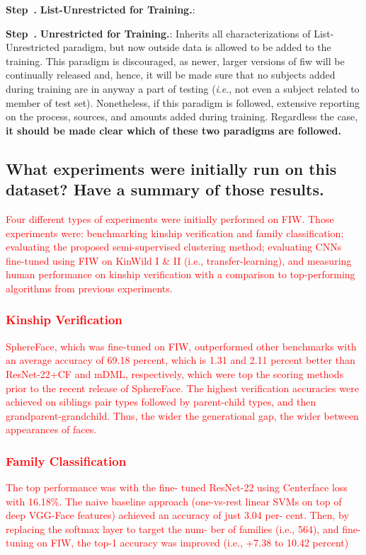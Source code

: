 \documentclass[a4paper,9pt]{extarticle}
\newcommand{\ie}{\textit{i}.\textit{e}., }
\newcounter{step}[section]
\newenvironment{step}[2][]
{%
    \refstepcounter{step}\par\medskip
    \noindent\textbf{Step~\thestep. #1}{\textbf{#2}:}\rmfamily
}%
{\medskip}
\begin{document}
\begin{multicols}{2}
\begin{step}{List-Unrestricted for Training.}
     \end{step}
    
    
\begin{step}{Unrestricted for Training.} Inherits all characterizations of List-Unrestricted paradigm, but now outside data is allowed to be added to the training. This paradigm is discouraged, as newer, larger versions of \gls{fiw} will be continually released and, hence, it will be made sure that no subjects added during training are in anyway a part of testing (\ie not even a subject related to member of test set). Nonetheless, if this paradigm is followed, extensive reporting on the process, sources, and amounts added during training.
 \end{step}
Regardless the case, \textbf{it should be made clear which of these two paradigms are followed.}

\subsection*{What experiments were initially run on this dataset? Have a summary of those results.}
\noindent \textcolor{red}{
Four different types of experiments were initially performed on FIW. Those experiments were:  benchmarking kinship verification and family classification; evaluating the proposed semi-supervised clustering method; evaluating CNNs fine-tuned using FIW on KinWild I \& II (i.e., transfer-learning), and measuring human performance on kinship verification with a comparison to top-performing algorithms from previous experiments.} 
\subsubsection*{\textcolor{red}{Kinship Verification}}
\textcolor{red}{
SphereFace, which was fine-tuned on FIW, outperformed other benchmarks with an average accuracy of 69.18 percent, which is 1.31 and 2.11 percent better than ResNet-22+CF and mDML, respectively, which were top the scoring methods prior to the recent release of SphereFace. The highest verification accuracies were achieved on siblings pair types followed by parent-child types, and then grandparent-grandchild. Thus, the wider the generational gap, the wider between appearances of faces.
}

\subsubsection*{\textcolor{red}{Family Classification}}
\textcolor{red}{
The top performance was with the fine- tuned ResNet-22 using Centerface loss with 16.18\%. The naive baseline approach (one-vs-rest linear SVMs on top of deep VGG-Face features) achieved an accuracy of just 3.04 per- cent. Then, by replacing the softmax layer to target the num- ber of families (i.e., 564), and fine-tuning on FIW, the top-1 accuracy was improved (i.e., +7.38 to 10.42 percent)
}


\end{multicols}
\end{document}
